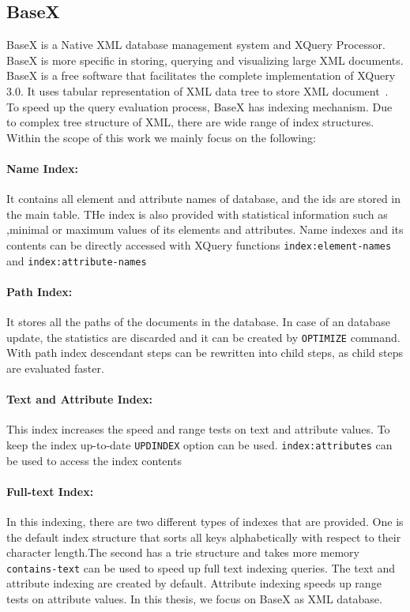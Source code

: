 	\subsection{BaseX}
	BaseX is a Native XML database management system and XQuery Processor. BaseX is more specific in storing, querying and visualizing large XML documents. BaseX is a free software that facilitates the complete implementation of XQuery 3.0. It uses tabular representation of XML data tree to store XML document~\citep{www/basex}. To speed up the query evaluation process, BaseX has indexing mechanism. Due to complex tree structure of XML, there are wide range of index structures. Within the scope of this work we mainly focus on the following:
	\paragraph{Name Index:} It contains all element and attribute names of database, and the ids are stored in the main table. THe index is also provided with statistical information such as ,minimal or maximum values of its elements and attributes. Name indexes and its contents can be directly accessed with XQuery functions \texttt{index:element-names} and \texttt{index:attribute-names}
	 \paragraph{Path Index:} It stores all the paths of the documents in the database. In case of an database update, the statistics are discarded and it can be created by \texttt{OPTIMIZE} command. With path index descendant steps can be rewritten into child steps, as child steps are evaluated faster.
	 \paragraph{Text and Attribute Index:} This index increases the speed and range tests on text and attribute values. To keep the index up-to-date \texttt{UPDINDEX} option can be used. \texttt{index:attributes} can be used to access the index contents
	  	 \paragraph{Full-text Index:} In this indexing, there are two different types of indexes that are provided. One is the default index structure that sorts all keys alphabetically with respect to their character length.The second has a trie structure and takes more memory \texttt{contains-text} can be used to speed up full text indexing queries.
	The text and attribute indexing are created by default. Attribute indexing speeds up range tests on attribute values. In this thesis, we focus on  BaseX as XML database.
	
